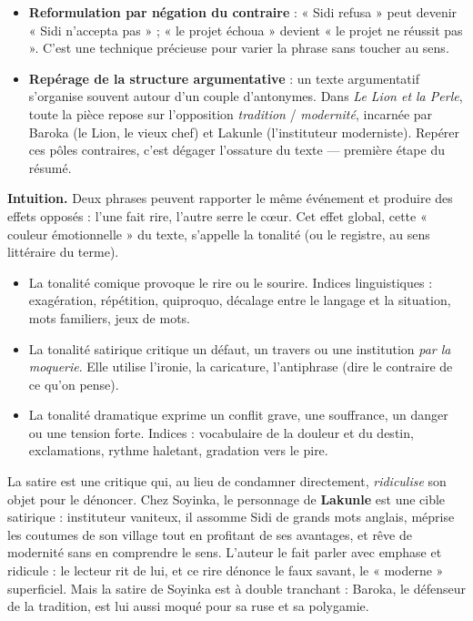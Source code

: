 \documentclass[11pt]{article}
\newcommand{\cle}[1]{{\popxbold\color{popdark}#1}}
\newcounter{popsec}
\newcounter{popsub}
\newcommand{\courssub}[1]{%
  \stepcounter{popsub}%
  \par\vspace{9pt}\noindent{\popxbold\fontsize{11.5}{13}\selectfont\color{popink}{\color{poporange}\thepopsec.\thepopsub}\hspace{6pt}#1}\par\nopagebreak\vspace{4pt}
}
\begin{document}
\begin{itemize}
\item \textbf{Reformulation par négation du contraire} : « Sidi refusa » peut devenir « Sidi n'accepta pas » ; « le projet échoua » devient « le projet ne réussit pas ». C'est une technique précieuse pour varier la phrase sans toucher au sens.
\item \textbf{Repérage de la structure argumentative} : un texte argumentatif s'organise souvent autour d'un couple d'antonymes. Dans \emph{Le Lion et la Perle}, toute la pièce repose sur l'opposition \emph{tradition} / \emph{modernité}, incarnée par Baroka (le Lion, le vieux chef) et Lakunle (l'instituteur moderniste). Repérer ces pôles contraires, c'est dégager l'ossature du texte — première étape du résumé.
\end{itemize}

\courssub{Les tonalités : comique, satirique, dramatique}

\textbf{Intuition.} Deux phrases peuvent rapporter le même événement et produire des effets opposés : l'une fait rire, l'autre serre le cœur. Cet effet global, cette « couleur émotionnelle » du texte, s'appelle la tonalité (ou le registre, au sens littéraire du terme).

\begin{definition}
\begin{itemize}
\item La \cle{tonalité comique} provoque le rire ou le sourire. Indices linguistiques : exagération, répétition, quiproquo, décalage entre le langage et la situation, mots familiers, jeux de mots.
\item La \cle{tonalité satirique} critique un défaut, un travers ou une institution \emph{par la moquerie}. Elle utilise l'ironie, la caricature, l'antiphrase (dire le contraire de ce qu'on pense).
\item La \cle{tonalité dramatique} exprime un conflit grave, une souffrance, un danger ou une tension forte. Indices : vocabulaire de la douleur et du destin, exclamations, rythme haletant, gradation vers le pire.
\end{itemize}
\end{definition}

\begin{definition}
La satire est une critique qui, au lieu de condamner directement, \emph{ridiculise} son objet pour le dénoncer. Chez Soyinka, le personnage de \textbf{Lakunle} est une cible satirique : instituteur vaniteux, il assomme Sidi de grands mots anglais, méprise les coutumes de son village tout en profitant de ses avantages, et rêve de modernité sans en comprendre le sens. L'auteur le fait parler avec emphase et ridicule : le lecteur rit de lui, et ce rire dénonce le faux savant, le « moderne » superficiel. Mais la satire de Soyinka est à double tranchant : Baroka, le défenseur de la tradition, est lui aussi moqué pour sa ruse et sa polygamie.
\end{definition}
\end{document}
